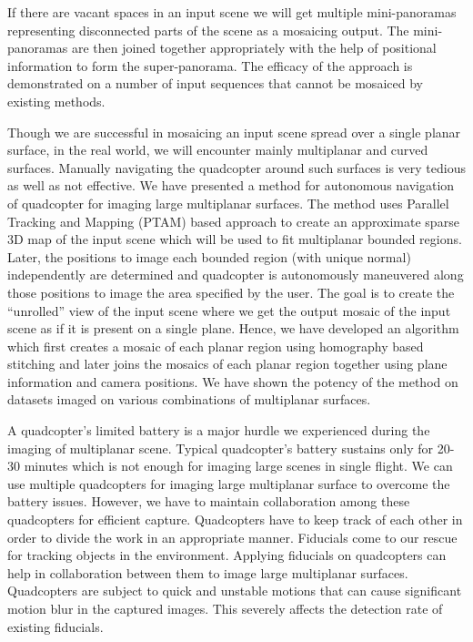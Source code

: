 If there are vacant spaces in an input scene we will get multiple mini-panoramas
representing disconnected parts of the scene as a mosaicing output.
The mini-panoramas are then joined together appropriately with the help of
positional information to form the super-panorama. The efficacy of the approach
is demonstrated on a number of input sequences that cannot be mosaiced by existing methods.

Though we are successful in mosaicing an input scene spread over a single planar
surface, in the real world, we will encounter mainly multiplanar and curved
surfaces. Manually navigating the quadcopter around such surfaces is very
tedious as well as not effective. We have presented a method for autonomous
navigation of quadcopter for imaging large multiplanar surfaces. The method
uses Parallel Tracking and Mapping (PTAM) based approach to create an 
approximate sparse 3D map of the input scene which will be used to fit
multiplanar bounded regions. Later, the positions to image each bounded region
(with unique normal) independently are determined and quadcopter is
autonomously maneuvered along those positions to image the area specified by
the user. The goal is to create the ``unrolled'' view of the input scene where we
get the output mosaic of the input scene as if it is present on a single plane.
Hence, we have developed an algorithm which first creates a mosaic of each
planar region using homography based stitching and later joins the mosaics of
each planar region together using plane information and camera positions. We
have shown the potency of the method on datasets imaged on various combinations
of multiplanar surfaces.

A quadcopter's limited battery is a major hurdle we experienced during
the imaging of multiplanar scene. Typical quadcopter's battery sustains only for
20-30 minutes which is not enough for imaging large scenes in single flight. We can use
multiple quadcopters for imaging large multiplanar surface to overcome the
battery issues. However, we have to maintain collaboration among these
quadcopters for efficient capture. Quadcopters have to keep track of each other
in order to divide the work in an appropriate manner. Fiducials come to our
rescue for tracking objects in the environment. Applying fiducials on quadcopters can
help in collaboration between them to image large multiplanar surfaces.
Quadcopters are subject to quick and unstable motions that can cause
significant motion blur in the captured images. This severely affects the
detection rate of existing fiducials. 

